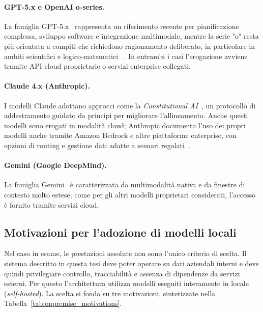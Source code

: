 \paragraph{GPT-5.x e OpenAI o-series.}
La famiglia GPT-5.x~\cite{openaiModels2026} rappresenta un riferimento recente
per pianificazione complessa, sviluppo software e integrazione multimodale,
mentre la serie "o" resta più orientata a compiti che richiedono ragionamento
deliberato, in particolare in ambiti scientifici e logico-matematici
~\cite{openai2024o1}. In entrambi i casi l'erogazione avviene tramite API cloud
proprietarie o servizi enterprise collegati.

\paragraph{Claude 4.x (Anthropic).}
I modelli Claude adottano approcci come la \textit{Constitutional AI}~\cite{bai2022constitutional}, 
un protocollo di addestramento guidato da principi
per migliorare l'allineamento. Anche questi modelli sono erogati in modalità
cloud; Anthropic documenta l'uso dei propri modelli anche tramite Amazon
Bedrock e altre piattaforme enterprise, con opzioni di routing e gestione dati
adatte a scenari regolati~\cite{anthropicModels2026}.

\paragraph{Gemini (Google DeepMind).}
La famiglia Gemini~\cite{googleGeminiModels2026} è caratterizzata da
multimodalità nativa e da finestre di contesto molto estese; come per gli altri
modelli proprietari considerati, l'accesso è fornito tramite servizi cloud.

\subsection{Motivazioni per l'adozione di modelli locali}
\label{subsec:onpremise_motivations}

Nel caso in esame, le prestazioni assolute non sono l'unico criterio di scelta.
Il sistema descritto in questa tesi deve poter operare su dati aziendali interni
e deve quindi privilegiare controllo, tracciabilità e assenza di dipendenze da
servizi esterni. Per questo l'architettura utilizza modelli eseguiti interamente
in locale (\textit{self-hosted}). La scelta si fonda su tre motivazioni,
sintetizzate nella Tabella~\ref{tab:onpremise_motivations}.

